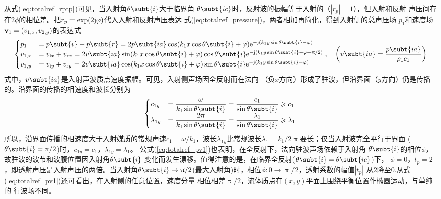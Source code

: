 \documentclass[UTF8]{ctexbook}
\begin{document}
从式(\ref{eq:totalref_rptp})可见，当入射角$\theta\subt{i}$大于临界角
$\theta\subt{ic}$时，反射波的振幅等于入射的（$|r_p|=1$），但入射和反射
声压间存在$2\phi$的相位差。把$r_p=\exp(2\mathrm{j} \varphi)$代入入射和反射声压表达
式(\ref{eq:totalref_pressure})，两者相加再简化，得到入射侧的总声压场
$p_1$和速度场$\vb{v}_1=(v_{1,x}, v_{2,y})$的表达式
\begin{equation}
	\label{eq:totalref_pv1}
	\begin{cases}
		p_1&= p\subt{i}+p\subt{r} = 2p\subt{ia}\cos(k_1x\cos\theta\subt{i}+\phi)
		\me^{-\mj (k_1y\sin\theta\subt{i}-\phi)}\\
		v_{1,x}&= v_{\mi x} + v_{\mathrm{r}x} = 2v\subt{ia}\sin
		(k_1x\cos\theta\subt{i}+\phi)\cos\theta\subt{i}
		\me^{-\mj \qty(k_1y\sin\theta\subt{i}-\phi+ \uppi/2)}\\
		v_{1,y}&= v_{\mi y} + v_{\mathrm{r}y} = 2v\subt{ia}\cos
		(k_1x\cos\theta\subt{i}+\phi)\sin\theta\subt{i}
		\me^{-\mj \qty(k_1y\sin\theta\subt{i}-\phi)}
	\end{cases}
	\qc \qty(v\subt{ia} = \frac{p\subt{ia}}{\rho_1c_1})
\end{equation}
式中，$v\subt{ia}$是入射声波质点速度振幅。可见，入射侧声场因全反射而在法向
（负$x$方向）形成了驻波，但沿界面（$y$方向）仍是传播的。沿界面的传播的相速度和波长分别为
\begin{equation}
	\label{eq:totalref_interface1}
	\begin{cases}
		c_{1y} & = \dfrac{\omega}{k_1\sin \theta\subt{i}}
		=\dfrac{c_1}{\sin\theta\subt{i}} \geq c_1\\
		\displaystyle
		\lambda_{1y} &= \dfrac{2\uppi}{k_1\sin\theta\subt{i}}
		=\dfrac{\lambda_1}{\sin\theta\subt{i}} \geq\lambda_1
	\end{cases}
\end{equation}
所以，沿界面传播的相速度大于入射媒质的常规声速$c_1=\omega /k_1$，波长$\lambda
_{1y}$比常规波长$\lambda_1 = k_1/2\uppi$要长；仅当入射波完全平行于界面
($\theta\subt{i}=\uppi/2$)时，$c_{1y}=c_1$，$\lambda_{1y}=\lambda_1$。
公式(\ref{eq:totalref_pv1})也表明，在全反射下，法向驻波声场依赖于入射角
$\theta\subt{i}$的相位$\phi$，故驻波的波节和波腹位置因入射角$\theta\subt{i}$
变化而发生漂移。值得注意的是，在临界全反射($\theta\subt{i}=\theta\subt{ic}$)下，
$\phi=0$，$t_p=2$，即透射声压是入射声压的两倍。当入射角$\theta\subt{i}\to 
\uppi/2$(最大入射角)时，相位$\phi: 0\to \uppi/2$，透射系数的幅值$|t_p|$
从2降至0.从式(\ref{eq:totalref_pv1})还可看出，在入射侧的任意位置，速度分量
相位相差$\uppi/2$，流体质点在$(x,y)$平面上围绕平衡位置作椭圆运动，与单纯的
行波场不同。
\end{document}
